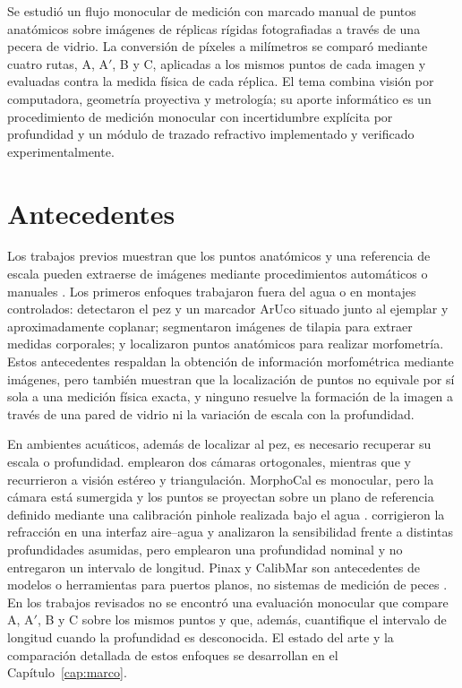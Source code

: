 \documentclass{report}
\newcommand{\Aprime}{A$'$}
\begin{document}
Se estudió un flujo monocular de medición con marcado manual de puntos anatómicos sobre imágenes de réplicas rígidas fotografiadas a través de una pecera de vidrio. La conversión de píxeles a milímetros se comparó mediante cuatro rutas, A, \Aprime, B y C, aplicadas a los mismos puntos de cada imagen y evaluadas contra la medida física de cada réplica. El tema combina visión por computadora, geometría proyectiva y metrología; su aporte informático es un procedimiento de medición monocular con incertidumbre explícita por profundidad y un módulo de trazado refractivo implementado y verificado experimentalmente.

\section{Antecedentes}

Los trabajos previos muestran que los puntos anatómicos y una referencia de escala pueden extraerse de imágenes mediante procedimientos automáticos o manuales \parencite{Correia2025,Saleh2023,Tseng2020}. Los primeros enfoques trabajaron fuera del agua o en montajes controlados: \textcite{Monkman2019} detectaron el pez y un marcador ArUco situado junto al ejemplar y aproximadamente coplanar; \textcite{Fernandes2020} segmentaron imágenes de tilapia para extraer medidas corporales; y \textcite{Saleh2023} localizaron puntos anatómicos para realizar morfometría. Estos antecedentes respaldan la obtención de información morfométrica mediante imágenes, pero también muestran que la localización de puntos no equivale por sí sola a una medición física exacta, y ninguno resuelve la formación de la imagen a través de una pared de vidrio ni la variación de escala con la profundidad.

En ambientes acuáticos, además de localizar al pez, es necesario recuperar su escala o profundidad. \textcite{AlJubouri2017} emplearon dos cámaras ortogonales, mientras que \textcite{Zhou2023} y \textcite{Seibold2026} recurrieron a visión estéreo y triangulación. MorphoCal es monocular, pero la cámara está sumergida y los puntos se proyectan sobre un plano de referencia definido mediante una calibración pinhole realizada bajo el agua \parencite{Vijayalakshmi2026}. \textcite{Yin2026} corrigieron la refracción en una interfaz aire--agua y analizaron la sensibilidad frente a distintas profundidades asumidas, pero emplearon una profundidad nominal y no entregaron un intervalo de longitud. Pinax y CalibMar son antecedentes de modelos o herramientas para puertos planos, no sistemas de medición de peces \parencite{Luczynski2017,Seegraber2025}. En los trabajos revisados no se encontró una evaluación monocular que compare A, \Aprime, B y C sobre los mismos puntos y que, además, cuantifique el intervalo de longitud cuando la profundidad es desconocida. El estado del arte y la comparación detallada de estos enfoques se desarrollan en el Capítulo~\ref{cap:marco}.
\end{document}
